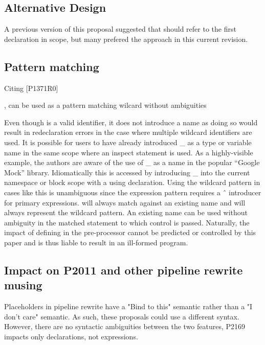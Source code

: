 \documentclass{wg21}
\begin{document}
\subsection{Alternative Design}

A previous version of this proposal suggested that \tcode{_} should refer to the first declaration in scope,
but many prefered the approach in this current revision.

\subsection{Pattern matching}

Citing [P1371R0]{\cite{P1371R0}, \tcode{_} can be used as a pattern matching wilcard without ambiguities

\begin{quoteblock}
Even though \tcode{_} is a valid identifier, it does not introduce a name as doing so would result in redeclaration
errors in the case where multiple wildcard \tcode{_} identifiers are used.
It is possible for users to have already introduced _ as a type or variable name in the same scope where an
inspect statement is used. As a highly-visible example, the authors are aware of the use of _ as a name in
the popular “Google Mock” library. Idiomatically this is accessed by introducing _ into the current namespace
or block scope with a using declaration. Using the wildcard pattern in cases like this is unambiguous since
the expression pattern requires a ˆ introducer for primary expressions. \tcode{\^_} will always match against an
existing name and \tcode{_} will always represent the wildcard pattern. An existing \tcode{_} name can be used without
ambiguity in the matched statement to which control is passed.
Naturally, the impact of defining \tcode{_} in the pre-processor cannot be predicted or controlled by this paper and
is thus liable to result in an ill-formed program.
\end{quoteblock}

\subsection{Impact on P2011 and other pipeline rewrite musing}

Placeholders in pipeline rewrite have a "Bind to this" semantic rather than a "I don't care" semantic.
As such, these proposals could use a different syntax.
However, there are no syntactic ambiguities between the two features, P2169 impacts only declarations, not expressions.

}
\end{document}
